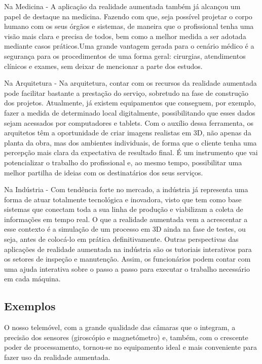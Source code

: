 \documentclass{report}
\begin{document}
Na Medicina - A aplicação da realidade aumentada também já alcançou um papel de destaque na medicina. Fazendo com que, seja possível projetar o corpo humano com os seus órgãos e sistemas, de maneira que o profissional tenha uma visão mais clara e precisa de todos, bem como a melhor medida a ser adotada mediante casos práticos.Uma grande vantagem gerada para o cenário médico é a segurança para os procedimentos de uma forma geral: cirurgias, atendimentos clínicos e exames, sem deixar de mencionar a parte dos estudos.

Na Arquitetura - Na arquitetura, contar com os recursos da realidade aumentada pode facilitar bastante a prestação do serviço, sobretudo na fase de construção dos projetos. Atualmente, já existem equipamentos que conseguem, por exemplo, fazer a medida de determinado local digitalmente, possibilitando que esses dados sejam acessados por computadores e tablets. Com o auxílio dessa ferramenta, os arquitetos têm a oportunidade de criar imagens realistas em 3D,  não apenas da planta da obra, mas dos ambientes individuais, de forma que o cliente tenha uma percepção mais clara da expectativa de resultado final. É um instrumento que vai potencializar o trabalho do profissional e, ao mesmo tempo, possibilitar uma melhor partilha de ideias com os destinatários dos seus serviços.

Na Indústria - Com tendência forte no mercado, a indústria já representa uma forma de atuar totalmente tecnológica e inovadora, visto que tem como base sistemas que conectam toda a sua linha de produção e viabilizam a coleta de informações em tempo real. O que a realidade aumentada vem a acrescentar a esse contexto é a simulação de um processo em 3D ainda na fase de testes, ou seja, antes de colocá-lo em prática definitivamente. Outras perspectivas das aplicações de realidade aumentada na indústria são os tutoriais interativos para os setores de inspeção e manutenção. Assim, os funcionários podem contar com uma ajuda interativa sobre o passo a passo para executar o trabalho necessário em cada máquina.

\subsection{Exemplos}
O nosso telemóvel, com a grande qualidade das câmaras que o integram, a precisão dos sensores (giroscópio e magnetómetro) e, também, com o crescente poder de processamento, tornou-se no equipamento ideal e mais conveniente para fazer uso da realidade aumentada.
\end{document}

